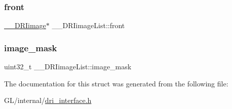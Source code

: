 \subsubsection{\texorpdfstring{front}{front}}
{\footnotesize\ttfamily \hyperlink{dri__interface_8h_a37e0407153595dc88fe5d25127645cf1}{\+\_\+\+\_\+\+D\+R\+Iimage}$\ast$ \+\_\+\+\_\+\+D\+R\+Iimage\+List\+::front}

\mbox{\label{struct_____d_r_iimage_list_aee02d39c3dc5a4c015e8f3a6af9d17b3}} 
\subsubsection{\texorpdfstring{image\+\_\+mask}{image\_mask}}
{\footnotesize\ttfamily uint32\+\_\+t \+\_\+\+\_\+\+D\+R\+Iimage\+List\+::image\+\_\+mask}



The documentation for this struct was generated from the following file\+:\begin{DoxyCompactItemize}
\item 
G\+L/internal/\hyperlink{dri__interface_8h}{dri\+\_\+interface.\+h}\end{DoxyCompactItemize}
